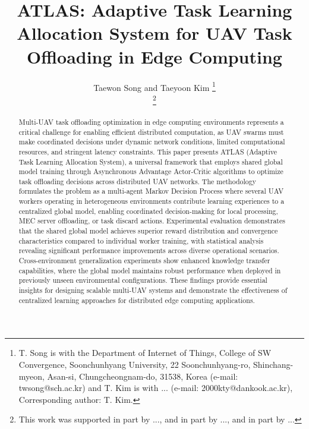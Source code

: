 \documentclass[journal]{IEEEtran}
\begin{document}
\title{ATLAS: Adaptive Task Learning Allocation System for UAV Task Offloading in Edge Computing}

\author{Taewon Song and Taeyoon Kim
\thanks{T. Song is with the Department of Internet of Things, College of SW Convergence, Soonchunhyang University, 22 Soonchunhyang-ro, Shinchang-myeon, Asan-si, Chungcheongnam-do, 31538, Korea (e-mail: twsong@sch.ac.kr) and T. Kim is with ... (e-mail: 2000kty@dankook.ac.kr), Corresponding author: T. Kim.}%

\thanks{This work was supported in part by ..., and in part by ..., and in part by ...}
}

{}

\maketitle

\begin{abstract}
Multi-UAV task offloading optimization in edge computing environments represents a critical challenge for enabling efficient distributed computation, as UAV swarms must make coordinated decisions under dynamic network conditions, limited computational resources, and stringent latency constraints. This paper presents ATLAS (Adaptive Task Learning Allocation System), a universal framework that employs shared global model training through Asynchronous Advantage Actor-Critic algorithms to optimize task offloading decisions across distributed UAV networks. The methodology formulates the problem as a multi-agent Markov Decision Process where several UAV workers operating in heterogeneous environments contribute learning experiences to a centralized global model, enabling coordinated decision-making for local processing, MEC server offloading, or task discard actions. Experimental evaluation demonstrates that the shared global model achieves superior reward distribution and convergence characteristics compared to individual worker training, with statistical analysis revealing significant performance improvements across diverse operational scenarios. Cross-environment generalization experiments show enhanced knowledge transfer capabilities, where the global model maintains robust performance when deployed in previously unseen environmental configurations. These findings provide essential insights for designing scalable multi-UAV systems and demonstrate the effectiveness of centralized learning approaches for distributed edge computing applications.
\end{abstract}
\end{document}
